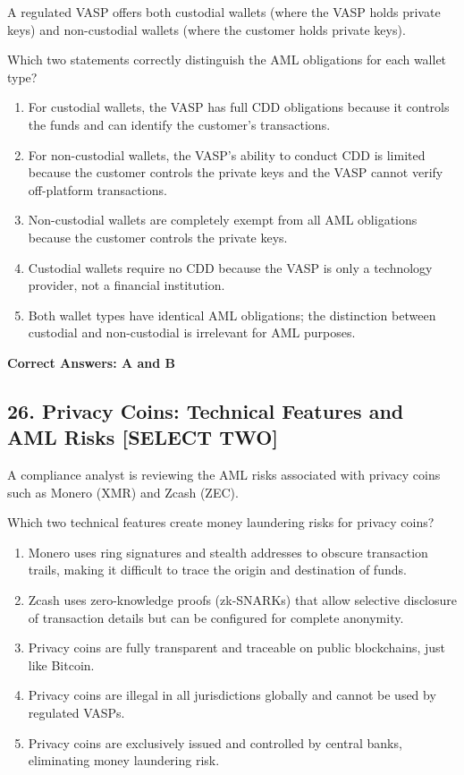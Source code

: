 \documentclass[11pt,a4paper]{article}
\begin{document}
	A regulated VASP offers both custodial wallets (where the VASP holds private keys) and non-custodial wallets (where the customer holds private keys).
	
	Which two statements correctly distinguish the AML obligations for each wallet type?
	
	\begin{enumerate}[label=\Alph*.]
		\item For custodial wallets, the VASP has full CDD obligations because it controls the funds and can identify the customer's transactions.
		\item For non-custodial wallets, the VASP's ability to conduct CDD is limited because the customer controls the private keys and the VASP cannot verify off-platform transactions.
		\item Non-custodial wallets are completely exempt from all AML obligations because the customer controls the private keys.
		\item Custodial wallets require no CDD because the VASP is only a technology provider, not a financial institution.
		\item Both wallet types have identical AML obligations; the distinction between custodial and non-custodial is irrelevant for AML purposes.
	\end{enumerate}
	
	\textbf{Correct Answers: A and B}
	
	\subsection{26. Privacy Coins: Technical Features and AML Risks \textnormal{[SELECT TWO]}}
	
	A compliance analyst is reviewing the AML risks associated with privacy coins such as Monero (XMR) and Zcash (ZEC).
	
	Which two technical features create money laundering risks for privacy coins?
	
	\begin{enumerate}[label=\Alph*.]
		\item Monero uses ring signatures and stealth addresses to obscure transaction trails, making it difficult to trace the origin and destination of funds.
		\item Zcash uses zero-knowledge proofs (zk-SNARKs) that allow selective disclosure of transaction details but can be configured for complete anonymity.
		\item Privacy coins are fully transparent and traceable on public blockchains, just like Bitcoin.
		\item Privacy coins are illegal in all jurisdictions globally and cannot be used by regulated VASPs.
		\item Privacy coins are exclusively issued and controlled by central banks, eliminating money laundering risk.
	\end{enumerate}
	
\end{document}
